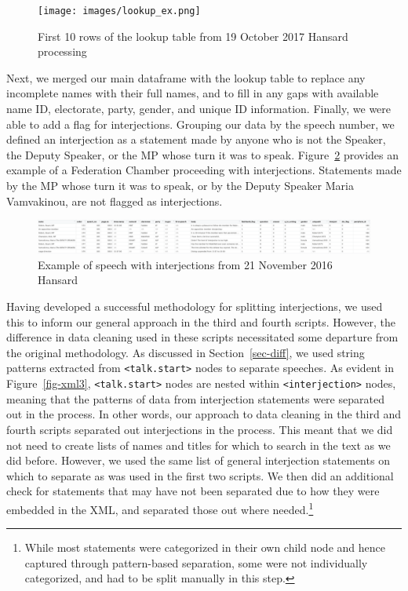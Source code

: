 \documentclass[
  letterpaper,
  DIV=11,
  numbers=noendperiod]{scrartcl}
\begin{document}
\begin{figure}

{\centering \texttt{[image: images/lookup\_ex.png]}

}

\caption{\label{fig-lookup}First 10 rows of the lookup table from 19
October 2017 Hansard processing}

\end{figure}

Next, we merged our main dataframe with the lookup table to replace any
incomplete names with their full names, and to fill in any gaps with
available name ID, electorate, party, gender, and unique ID information.
Finally, we were able to add a flag for interjections. Grouping our data
by the speech number, we defined an interjection as a statement made by
anyone who is not the Speaker, the Deputy Speaker, or the MP whose turn
it was to speak. Figure~\ref{fig-interject} provides an example of a
Federation Chamber proceeding with interjections. Statements made by the
MP whose turn it was to speak, or by the Deputy Speaker Maria
Vamvakinou, are not flagged as interjections.

\begin{figure}

{\centering \includegraphics{images/interject_ex.png}

}

\caption{\label{fig-interject}Example of speech with interjections from
21 November 2016 Hansard}

\end{figure}

Having developed a successful methodology for splitting interjections,
we used this to inform our general approach in the third and fourth
scripts. However, the difference in data cleaning used in these scripts
necessitated some departure from the original methodology. As discussed
in Section~\ref{sec-diff}, we used string patterns extracted from
\texttt{\textless{}talk.start\textgreater{}} nodes to separate speeches.
As evident in Figure~\ref{fig-xml3},
\texttt{\textless{}talk.start\textgreater{}} nodes are nested within
\texttt{\textless{}interjection\textgreater{}} nodes, meaning that the
patterns of data from interjection statements were separated out in the
process. In other words, our approach to data cleaning in the third and
fourth scripts separated out interjections in the process. This meant
that we did not need to create lists of names and titles for which to
search in the text as we did before. However, we used the same list of
general interjection statements on which to separate as was used in the
first two scripts. We then did an additional check for statements that
may have not been separated due to how they were embedded in the XML,
and separated those out where needed.\footnote{While most statements
  were categorized in their own child node and hence captured through
  pattern-based separation, some were not individually categorized, and
  had to be split manually in this step.}
\end{document}
